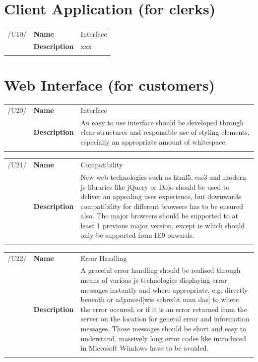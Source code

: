 \documentclass[11pt,a4paper,oneside,svgnames]{report}
\begin{document}
\section{Client Application (for clerks)}
\noindent
\begin{tabular}{llp{10cm}}
\cellcolor{white}/U10/	& \textbf{Name}			& Interface\\
\cellcolor{white}		& \textbf{Description}	& xxx\\
\cellcolor{white}		\hfill \\
\end{tabular}

\section{Web Interface (for customers)}
\noindent
\begin{tabular}{llp{10cm}}
\cellcolor{white}/U20/	& \textbf{Name}			& Interface\\
\cellcolor{white}		& \textbf{Description}	& An easy to use interface should be developed through clear structures and responsible use of styling elements, especially an appropriate amount of whitespace.\\
\cellcolor{white}		\hfill \\
\end{tabular}

\noindent
\begin{tabular}{llp{10cm}}
\cellcolor{white}/U21/	& \textbf{Name}			& Compatibility\\
\cellcolor{white}		& \textbf{Description}	& New web technologies such as \acrshort{html}5, \acrshort{css}3 and modern \gls{js} libraries like jQuery or Dojo should be used to deliver an appealing user experience, but downwards compatibility for different browsers has to be ensured also. The major browsers should be supported to at least 1 previous major version, except \gls{ie} which should only be supported from IE9 onwards.\\
\cellcolor{white}		\hfill \\
\end{tabular}

\noindent
\begin{tabular}{llp{10cm}}
\cellcolor{white}/U22/	& \textbf{Name}			& Error Handling\\
\cellcolor{white}		& \textbf{Description}	& A graceful error handling should be realised through means of various \gls{js} technologies displaying error messages instantly and where appropriate, e.g. directly beneath or adjanced[wie schreibt man das] to where the error occured, or if it is an error returned from the server on the location for general error and information messages. Those messages should be short and easy to understand, massively long error codes like introduced in Microsoft Windows have to be avoided.\\
\cellcolor{white}		\hfill \\
\end{tabular}
\end{document}
